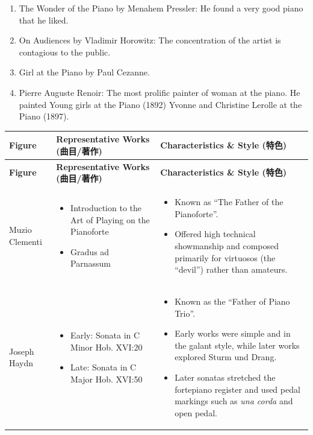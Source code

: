 \documentclass[math,code]{amznotes}
\theoremstyle{remark}
\begin{document}
\begin{enumerate}
\begin{enumerate}
        \item The Wonder of the Piano by Menahem Pressler: He found a very good piano that he liked.
        \item On Audiences by Vladimir Horowitz: The concentration of the artist is contagious to the public.
        \item Girl at the Piano by Paul Cezanne.
        \item Pierre Auguste Renoir: The most prolific painter of woman at the piano. He painted Young girls at the Piano (1892) Yvonne and Christine Lerolle at the Piano (1897).
    \end{enumerate}
\end{enumerate}

\small
\begin{longtable}{|p{3cm}|p{6cm}|p{7cm}|}
\hline
\textbf{Figure} & \textbf{Representative Works (曲目/著作)} & \textbf{Characteristics \& Style (特色)} \\
\hline
\endfirsthead

\hline
\textbf{Figure} & \textbf{Representative Works (曲目/著作)} & \textbf{Characteristics \& Style (特色)} \\
\hline
\endhead


Muzio Clementi &
\begin{itemize}[leftmargin=*]
\item Introduction to the Art of Playing on the Pianoforte
\item Gradus ad Parnassum
\end{itemize}
&
\begin{itemize}[leftmargin=*]
\item Known as ``The Father of the Pianoforte''.
\item Offered high technical showmanship and composed primarily for virtuosos (the ``devil'') rather than amateurs.
\end{itemize}
\\
\hline


Joseph Haydn &
\begin{itemize}[leftmargin=*]
\item Early: Sonata in C Minor Hob. XVI:20
\item Late: Sonata in C Major Hob. XVI:50
\end{itemize}
&
\begin{itemize}[leftmargin=*]
\item Known as the ``Father of Piano Trio''.
\item Early works were simple and in the galant style, while later works explored Sturm und Drang.
\item Later sonatas stretched the fortepiano register and used pedal markings such as \textit{una corda} and open pedal.
\end{itemize}
\\
\hline



\end{longtable}
\end{document}

